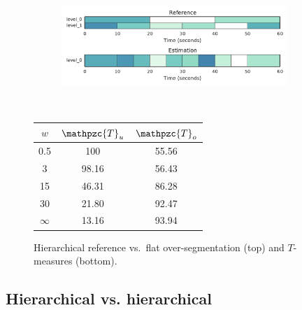 \documentclass{article}
\def\shag{\ensuremath{\mathpzc{T}}}
\begin{document}
\begin{figure}[t]
  \centering
  \begin{subfigure}{0.5\textwidth}
    \centering
    \includegraphics[width=0.94\textwidth]{figs/hier-flatsmaller.pdf}
  \end{subfigure}%
  \\
  \begin{minipage}{0.5\textwidth}
    \centering
    \vspace{10pt}
    \begin{tabular}{|c|c|c|}
      \hline
      $w$       & $\shag_u$    & $\shag_o$      \\
      \hline
      0.5       & 100       & 55.56      \\     
      3         & 98.16     & 56.43      \\
      15        & 46.31     & 86.28    \\
      30        & 21.80     & 92.47    \\
      $\infty$  & 13.16     & 93.94    \\
      \hline
    \end{tabular}
  \end{minipage}
  \caption{Hierarchical reference vs.\ flat over-segmentation (top) and $T$-measures (bottom).}
  \label{fig:hier-flatsmaller}
\end{figure}
\subsection{Hierarchical vs. hierarchical}

\end{document}
